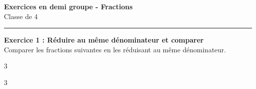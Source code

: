 \documentclass[12pt,a4paper]{exam}
\begin{document}
\begin{center}
    {\Large \textbf{Exercices en demi groupe - Fractions}}\\[2mm]
    {\large Classe de 4\ieme}\\[2mm]
\end{center}

\vspace{0.4cm}
\hrule
\vspace{0.6cm}

\textbf{Exercice 1 : Réduire au même dénominateur et comparer}
\vspace{5pt}\\
Comparer les fractions suivantes en les réduisant au même dénominateur.

\vspace{0.3cm}

\begin{multicols}{3}
\end{multicols}
\begin{multicols}{3}
\end{multicols}
\end{document}
